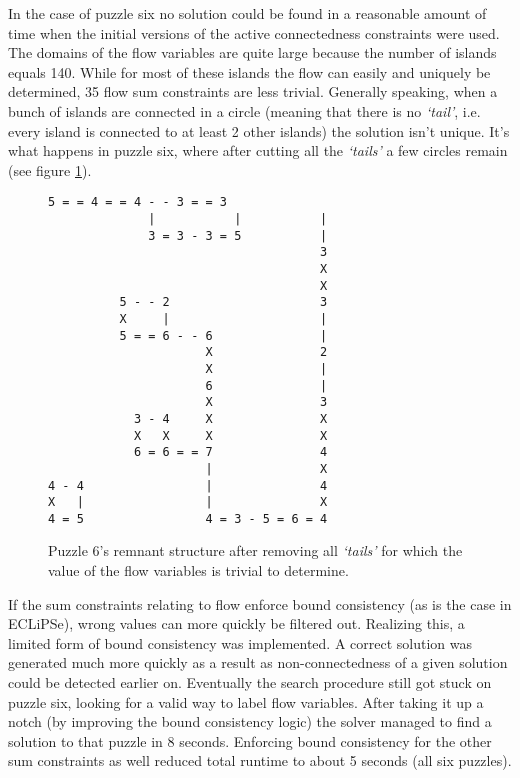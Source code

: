 In the case of puzzle six no solution could be found in a reasonable amount of time when the initial versions of the active connectedness constraints were used. The domains of the flow variables are quite large because the number of islands equals 140. While for most of these islands the flow can easily and uniquely be determined, 35 flow sum constraints are less trivial. Generally speaking, when a bunch of islands are connected in a circle (meaning that there is no \textit{`tail'}, i.e. every island is connected to at least 2 other islands) the solution isn't unique. It's what happens in puzzle six, where after cutting all the \textit{`tails'} a few circles remain (see figure \ref{fig:circles}).

\vspace{0.1cm}
\begin{figure}[H]
\centering
\begin{BVerbatim}[fontsize=\footnotesize]
              5 = = 4 = = 4 - - 3 = = 3
              |           |           |
              3 = 3 - 3 = 5           |
                                      3
                                      X
                                      X
          5 - - 2                     3
          X     |                     |
          5 = = 6 - - 6               |
                      X               2
                      X               |
                      6               |
                      X               3
            3 - 4     X               X
            X   X     X               X
            6 = 6 = = 7               4
                      |               X
4 - 4                 |               4
X   |                 |               X
4 = 5                 4 = 3 - 5 = 6 = 4
\end{BVerbatim}
\caption{Puzzle 6's remnant structure after removing all \textit{`tails'} for which the value of the flow variables is trivial to determine.}
\label{fig:circles}
\end{figure}

If the sum constraints relating to flow enforce bound consistency (as is the case in ECLiPSe), wrong values can more quickly be filtered out. Realizing this, a limited form of bound consistency was implemented. A correct solution was generated much more quickly as a result as non-connectedness of a given solution could be detected earlier on. Eventually the search procedure still got stuck on puzzle six, looking for a valid way to label flow variables. After taking it up a notch (by improving the bound consistency logic) the solver managed to find a solution to that puzzle in 8 seconds. Enforcing bound consistency for the other sum constraints as well reduced total runtime to about 5  seconds (all six puzzles).